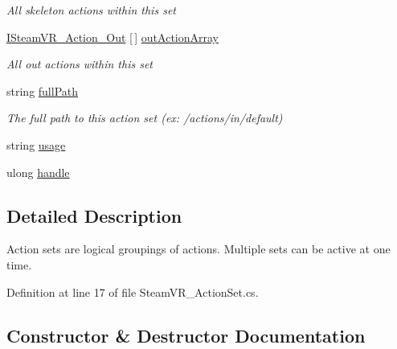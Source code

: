 \begin{DoxyCompactItemize}
\begin{DoxyCompactList}\small\item\em All skeleton actions within this set \end{DoxyCompactList}\item 
\mbox{\hyperlink{interface_valve_1_1_v_r_1_1_i_steam_v_r___action___out}{I\+Steam\+V\+R\+\_\+\+Action\+\_\+\+Out}} \mbox{[}$\,$\mbox{]} \mbox{\hyperlink{class_valve_1_1_v_r_1_1_steam_v_r___action_set_aec75fd69b96d1f0f7dd0c807885244fe}{out\+Action\+Array}}
\begin{DoxyCompactList}\small\item\em All out actions within this set \end{DoxyCompactList}\item 
string \mbox{\hyperlink{class_valve_1_1_v_r_1_1_steam_v_r___action_set_aa7318fdfffc15351b27d55255f9da651}{full\+Path}}
\begin{DoxyCompactList}\small\item\em The full path to this action set (ex\+: /actions/in/default) \end{DoxyCompactList}\item 
string \mbox{\hyperlink{class_valve_1_1_v_r_1_1_steam_v_r___action_set_a2f7ecd341561b80ddbb177dabbaa0036}{usage}}
\item 
ulong \mbox{\hyperlink{class_valve_1_1_v_r_1_1_steam_v_r___action_set_ae8d12a8a8939aca9bc09d5b2e6863539}{handle}}
\end{DoxyCompactItemize}


\subsection{Detailed Description}
Action sets are logical groupings of actions. Multiple sets can be active at one time. 



Definition at line 17 of file Steam\+V\+R\+\_\+\+Action\+Set.\+cs.



\subsection{Constructor \& Destructor Documentation}
\mbox{\label{class_valve_1_1_v_r_1_1_steam_v_r___action_set_a91a20f8025cb5281f23e9c7d519af517}} 

